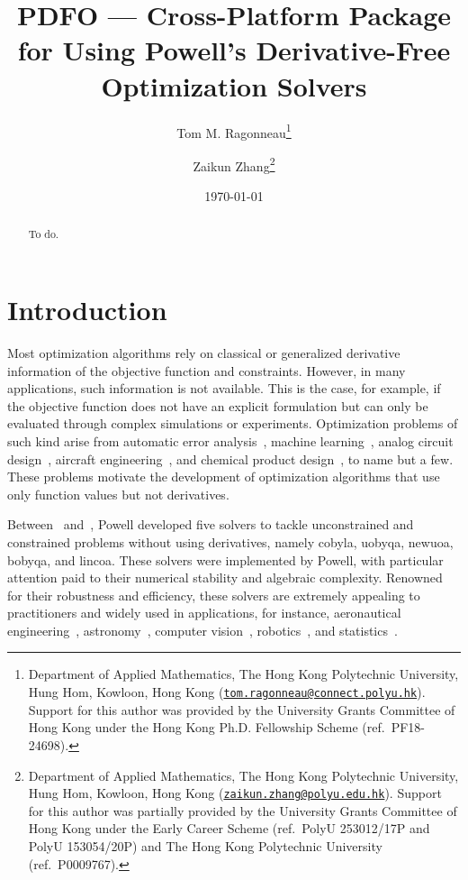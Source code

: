 \documentclass[11pt,draft]{article}
\title{PDFO --- Cross-Platform Package for Using Powell's Derivative-Free Optimization Solvers}
\author{
    Tom M. Ragonneau\thanks{
        Department of Applied Mathematics,
        The Hong Kong Polytechnic University,
        Hung Hom, Kowloon, Hong Kong
        (\href{mailto:tom.ragonneau@connect.polyu.hk}{\texttt{tom.ragonneau@connect.polyu.hk}}).
        Support for this author was provided by the University Grants Committee of Hong Kong under the Hong Kong Ph.D. Fellowship Scheme (ref.\ PF18-24698).
    }
    \and Zaikun Zhang\thanks{
        Department of Applied Mathematics,
        The Hong Kong Polytechnic University,
        Hung Hom, Kowloon, Hong Kong
        (\href{mailto:zaikun.zhang@polyu.edu.hk}{\texttt{zaikun.zhang@polyu.edu.hk}}).
        Support for this author was partially provided by the University Grants Committee of Hong Kong under the  Early Career Scheme (ref.\ PolyU 253012/17P and PolyU 153054/20P) and The Hong Kong Polytechnic University (ref.\ P0009767).
    }
}
\date{\today}
\numberwithin{equation}{section}
\begin{document}
\maketitle

\begin{abstract}
    To do.
\end{abstract}

\section{Introduction}

Most optimization algorithms rely on classical or generalized derivative information of the objective function and constraints.
However, in many applications, such information is not available.
This is the case, for example, if the objective function does not have an explicit formulation but can only be evaluated through complex simulations or experiments.
Optimization problems of such kind arise from automatic error analysis~\cite{Higham_1993,Higham_2002}, machine learning~\cite{Ghanbari_Scheinberg_2017}, analog circuit design~\cite{Latorre_Etal_2019}, aircraft engineering~\cite{Gazaix_Etal_2019}, and chemical product design~\cite{Sun_Etal_2020}, to name but a few.
These problems motivate the development of optimization algorithms that use only function values but not derivatives.

Between~\citeyear{Powell_1994} and~\citeyear{Powell_2015}, Powell developed five solvers to tackle unconstrained and constrained problems without using derivatives, namely \gls{cobyla}, \gls{uobyqa}, \gls{newuoa}, \gls{bobyqa}, and \gls{lincoa}.
These solvers were implemented by Powell, with particular attention paid to their numerical stability and algebraic complexity.
Renowned for their robustness and efficiency, these solvers are extremely appealing to practitioners and widely used in applications, for instance, aeronautical engineering~\cite{Gallard_Etal_2018b}, astronomy~\cite{Biviano_Etal_2013,Mamon_Biviano_Boue_2013}, computer vision~\cite{Izadinia_Shan_Seitz_2017}, robotics~\cite{Mombaur_Truong_Laumond_2010}, and statistics~\cite{Bates_Etal_2015}.
\end{document}
